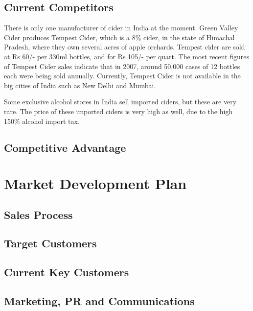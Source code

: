 \documentclass[11pt]{article}
\begin{document}
	\subsection{Current Competitors}
		There is only one manufacturer of cider in India at the moment. Green Valley
		Cider produces Tempest Cider, which is a 8\% cider, in the state of Himachal
		Pradesh, where they own several acres of apple orchards. Tempest cider are sold 
		at Rs 60/- per 330ml bottles, and for Rs 105/- per quart. The most recent figures
		of Tempest Cider sales indicate that in 2007, around 50,000 cases of 12 bottles
		each were being sold annually. Currently, Tempest Cider is not available in the
		big cities of India such as New Delhi and Mumbai.

		Some exclusive alcohol stores in India sell imported ciders, but these are very
		rare. The price of these imported ciders is very high as well, due to the high 
		150\% alcohol import tax.

  \subsection{Competitive Advantage}

\newpage
\section{Market Development Plan}
  \subsection{Sales Process}
  \subsection{Target Customers}
  \subsection{Current Key Customers}
  \subsection{Marketing, PR and Communications}
\newpage
\end{document}
